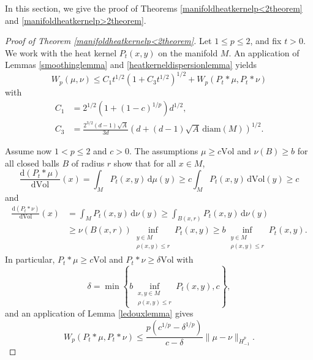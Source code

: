 \documentclass[11pt,a4paper]{article}
\theoremstyle{definition}
\begin{document}
In this section, we give the proof of Theorems \ref{manifoldheatkernelp<2theorem} and \ref{manifoldheatkernelp>2theorem}.

\begin{proof}[Proof of Theorem \ref{manifoldheatkernelp<2theorem}] Let $1 \le p \le 2$, and fix $t>0$. We work with the heat kernel $P_t(x,y)$ on the manifold $M$. An application of Lemmas \ref{smoothinglemma} and \ref{heatkerneldispersionlemma} yields
\begin{equation}\label{manifoldheatkernelstep1}
W_p (\mu, \nu) \le C_1 t^{1/2} \left(1+C_3 t^{1/2} \right)^{1/2} + W_p(P_t * \mu, P_t * \nu)
\end{equation}
with
\[ \begin{split} C_1 &= 2^{1/2} (1+(1-c)^{1/p}) d^{1/2}, \\ C_3 &= \frac{2^{3/2}(d-1) \sqrt{A}}{3d} \left( d + (d-1) \sqrt{A} \, \mathrm{diam}(M) \right)^{1/2} . \end{split} \]

Assume now $1<p \le 2$ and $c>0$. The assumptions $\mu \ge c \mathrm{Vol}$ and $\nu(B) \ge b$ for all closed balls $B$ of radius $r$ show that for all $x \in M$,
\[ \frac{\mathrm{d}(P_t * \mu)}{\mathrm{d}\mathrm{Vol}}(x) = \int_M P_t (x,y) \, \mathrm{d}\mu(y) \ge c \int_M P_t (x,y) \, \mathrm{d}\mathrm{Vol}(y) \ge c \]
and
\[ \begin{split} \frac{\mathrm{d}(P_t * \nu)}{\mathrm{d}\mathrm{Vol}}(x) &= \int_M P_t (x,y) \, \mathrm{d}\nu(y) \ge \int_{B(x,r)} P_t(x,y) \, \mathrm{d}\nu (y) \\ &\ge \nu(B(x,r)) \inf_{\substack{y \in M \\ \rho (x,y) \le r}} P_t (x,y) \ge b \inf_{\substack{y \in M \\ \rho (x,y) \le r}} P_t (x,y) . \end{split} \]
In particular, $P_t * \mu \ge c \mathrm{Vol}$ and $P_t * \nu \ge \delta \mathrm{Vol}$ with
\[ \delta = \min \left\{ b \inf_{\substack{x,y \in M \\ \rho (x,y) \le r}} P_t (x,y), c \right\}, \]
and an application of Lemma \ref{ledouxlemma} gives
\begin{equation}\label{manifoldheatkernelstep2}
W_p (P_t * \mu, P_t * \nu) \le \frac{p(c^{1/p} - \delta^{1/p})}{c-\delta} \| \mu - \nu \|_{\dot{H}_{-1}^p} .
\end{equation}


\end{proof}
\end{document}
